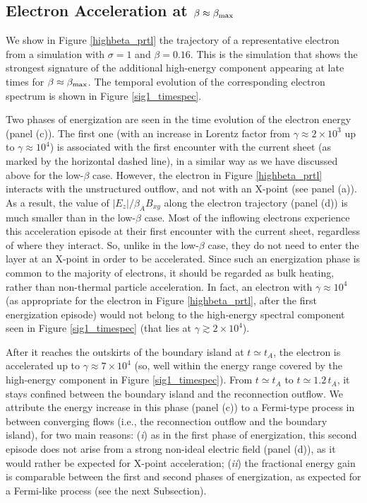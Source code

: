 \subsection{Electron Acceleration at $\beta\approx \beta_{\rm max}$}
We show in Figure \ref{highbeta_prtl} the trajectory of a representative electron from a simulation with $\sigma=1$ and $\beta=0.16$. This is the simulation that shows the strongest signature of the additional high-energy component appearing at late times for $\beta\approx \beta_{\rm max}$. The temporal evolution of the corresponding electron spectrum is shown in Figure \ref{sig1_timespec}.

Two phases of energization are seen in the time evolution of the electron energy (panel (c)). The first one (with an increase in Lorentz factor from $\gamma \approx 2\times 10^3$ up to $\gamma \approx 10^4$) is associated with the first encounter with the current sheet (as marked by the horizontal dashed line), in a similar way as we have discussed above for the low-$\beta$ case. However, the electron in  Figure \ref{highbeta_prtl} interacts with the unstructured outflow, and not with an X-point (see panel (a)). As a result, the value of $|E_{z}|/\beta_{A}B_{xy}$ along the electron trajectory (panel (d)) is much smaller than in the low-$\beta$ case. Most of the inflowing electrons experience this acceleration episode at their first encounter with the current sheet, regardless of where they interact. So, unlike in the low-$\beta$ case, they do not need to enter the layer at an X-point in order to be accelerated. Since such an energization phase is common to the majority of electrons, it should be regarded as bulk heating, rather  than non-thermal particle acceleration. In fact, an electron with $\gamma \approx 10^4$ (as appropriate for the electron in Figure \ref{highbeta_prtl}, after the first energization episode) would not belong to the high-energy spectral component seen in Figure \ref{sig1_timespec} (that lies at $\gamma\gtrsim 2\times 10^4$). 

After it reaches the outskirts of the boundary island at $t\simeq t_A$, the electron is  accelerated up to $\gamma \approx 7\times 10^4$ (so, well within the energy range covered by the high-energy component in Figure \ref{sig1_timespec}).  From $t\simeq t_A$ to $t\simeq1.2\, t_A$, it stays confined between the boundary island and the reconnection outflow. We attribute the energy increase in this phase (panel (c)) to a Fermi-type process in between converging flows (i.e., the reconnection outflow and the boundary island), for two main reasons: (\textit{i}) as in the first phase of energization, this second episode does not arise from a strong non-ideal electric field (panel (d)), as it would rather be expected for X-point acceleration; (\textit{ii}) the fractional energy gain is comparable between the first and second phases of energization, as expected for a Fermi-like process (see the next Subsection).


